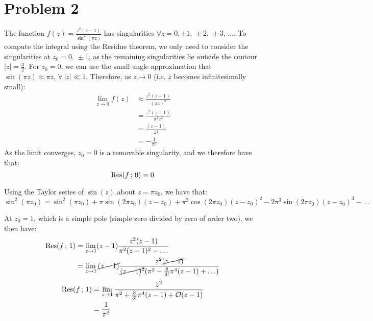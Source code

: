 \documentclass[letterpaper, titlepage, DIV=14]{scrartcl}
\begin{document}
    \section*{Problem 2}
    The function $f(z)=\frac{z^{2}(z-1)}{\sin^{2}(\pi z)}$ has singularities $\forall z = 0, \pm 1, \, \pm2, \, \pm3, \, \ldots$. To compute the integral using the Residue theorem, we only need to consider the singularities at $z_{0} = 0, \, \pm1$, as the remaining singularities lie outside the contour $|z|=\frac{3}{2}$. For $z_{0} = 0$, we can use the small angle approximation that $\sin(\pi z) \approx \pi z$, $\forall \, |z| \ll 1$. Therefore, as $z\to0$ (i.e. $z$ becomes infinitesimally small):
    \begin{align*}
      \lim_{z\to0}f(z) &\approx \frac{z^{2}(z-1)}{(\pi z)^{2}} \\
      &= \frac{z^{2}(z-1)}{\pi^{2} z^{2}} \\
      &= \frac{(z-1)}{\pi^{2}} \\
      &= -\frac{1}{\pi^{2}} 
    \end{align*}
    As the limit converges, $z_{0}=0$ is a removable singularity, and we therefore have that:
    \begin{equation*}
      \Res(f \, ; \, 0) = 0 
    \end{equation*}
    
    Using the Taylor series of $\sin(z)$ about $z=\pi z_{0}$, we have that:
    \begin{equation*}
      \sin^{2}(\pi z_{0}) = \sin^{2}(\pi z_{0}) + \pi\sin(2\pi z_{0})(z-z_{0}) + \pi^{2}\cos(2\pi z_{0})(z-z_{0})^{2} - 2\pi^{3}\sin(2\pi z_{0})(z-z_{0})^{3} - \ldots
    \end{equation*}

    At $z_{0}=1$, which is a simple pole (simple zero divided by zero of order two), we then have:
    \begin{align*}
      \Res(f \, ; \, 1) &= \lim_{z\to1}(z-1) \frac{z^{2}(z-1)}{\pi^{2}(z-1)^{2} - \ldots} \\
        &= \lim_{z\to1}\cancel{(z-1)} \frac{z^{2}\cancel{(z-1)}}{\cancel{(z-1)^{2}}(\pi^{2} - \frac{8}{3!}\pi^{4}(z-1) + \ldots)} \\
    \end{align*}
    \begin{align*}
      \Res(f \, ; \, 1) &= \lim_{z\to1} \frac{z^{2}}{\pi^{2} + \frac{8}{3!}\pi^{4}(z-1) + \mathcal{O}(z-1)} \\
      &= \frac{1}{\pi^{2}} \\
    \end{align*}
    
\end{document}
